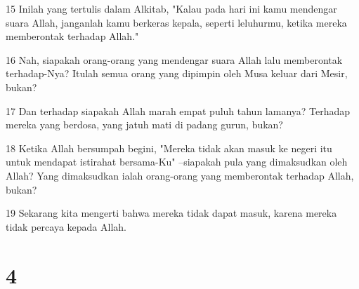 \par 15 Inilah yang tertulis dalam Alkitab, "Kalau pada hari ini kamu mendengar suara Allah, janganlah kamu berkeras kepala, seperti leluhurmu, ketika mereka memberontak terhadap Allah."
\par 16 Nah, siapakah orang-orang yang mendengar suara Allah lalu memberontak terhadap-Nya? Itulah semua orang yang dipimpin oleh Musa keluar dari Mesir, bukan?
\par 17 Dan terhadap siapakah Allah marah empat puluh tahun lamanya? Terhadap mereka yang berdosa, yang jatuh mati di padang gurun, bukan?
\par 18 Ketika Allah bersumpah begini, "Mereka tidak akan masuk ke negeri itu untuk mendapat istirahat bersama-Ku" --siapakah pula yang dimaksudkan oleh Allah? Yang dimaksudkan ialah orang-orang yang memberontak terhadap Allah, bukan?
\par 19 Sekarang kita mengerti bahwa mereka tidak dapat masuk, karena mereka tidak percaya kepada Allah.

\chapter{4}

